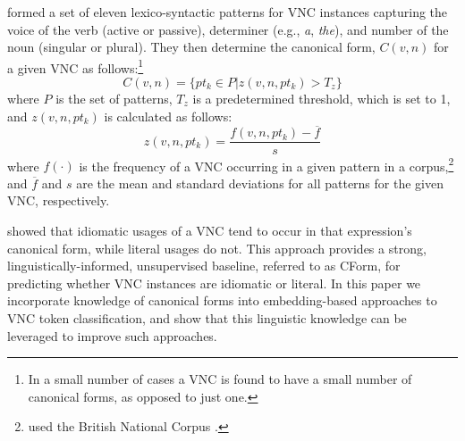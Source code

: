 \documentclass[11pt,a4paper]{article}
\begin{document}

 formed a set of eleven lexico-syntactic patterns
for VNC instances capturing the voice of the verb (active or passive),
determiner (e.g., \emph{a}, \emph{the}), and number of the noun
(singular or plural).  They then determine the canonical form,
$C(v,n)$ for a given VNC as follows:\footnote{In a small number of
  cases a VNC is found to have a small number of canonical forms, as
  opposed to just one.}
\begin{equation}
C(v,n) = \{ pt_k \in P | z(v,n,pt_k) > T_z \}
\end{equation}
\noindent
where $P$ is the set of patterns, $T_z$ is a predetermined threshold,
which is set to 1, and $z(v,n,pt_k)$ is calculated as follows:
\begin{equation}
z(v,n,pt_k)= \frac{f(v,n,pt_k)-\overline{f}}{s}
\end{equation}
\noindent
where $f(\cdot)$ is the frequency of a VNC occurring in a given
pattern in a corpus,\footnote{ used the British
  National Corpus \citep{Burnard2000}.} and $\overline{f}$ and $s$ are
the mean and standard deviations for all patterns for the given VNC,
respectively.

 showed that idiomatic usages of a VNC tend to
occur in that expression's canonical form, while literal usages do
not. This approach provides a strong, linguistically-informed,
unsupervised baseline, referred to as CForm, for predicting whether
VNC instances are idiomatic or literal. In this paper we incorporate
knowledge of canonical forms into embedding-based approaches to VNC
token classification, and show that this linguistic knowledge can be
leveraged to improve such approaches.






\end{document}

